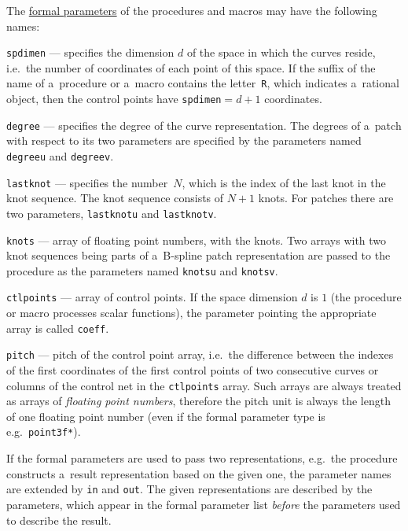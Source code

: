 The \underline{formal parameters} of the procedures and macros may have
the following names:
\begin{mydescription}
  \item\texttt{spdimen} --- specifies the dimension $d$ of the space in which
    the curves reside, i.e.\ the number of coordinates of each point of this
    space.
    If the suffix of the name of a~procedure or a~macro contains the
    letter~\texttt{R}, which indicates a~rational object, then the control points
    have \texttt{spdimen}${}=d+1$ coordinates.
  \item\begin{sloppypar}\texttt{degree} --- specifies the degree of the curve representation.
    The degrees of a~patch with respect to its two parameters are specified by
    the parameters named \texttt{degreeu} and \texttt{degreev}.%
    \end{sloppypar}
  \item\texttt{lastknot} --- specifies the number~$N$, which is the index
    of the last knot in the knot sequence. The knot sequence consists of
    $N+1$ knots. For patches there are two parameters, \texttt{lastknotu} and
    \texttt{lastknotv}.
  \item\texttt{knots} --- array of floating point numbers, with the knots.
    Two arrays with two knot sequences being parts of a~B-spline patch
    representation are passed to the procedure as the parameters named
    \texttt{knotsu} and \texttt{knotsv}.
  \item\texttt{ctlpoints} --- array of control points. If the space
    dimension $d$ is $1$ (the procedure or macro processes scalar functions),
    the parameter pointing the appropriate array is called \texttt{coeff}.
  \item\texttt{pitch} --- pitch of the control point array, i.e.\ the
    difference between the indexes of the first coordinates of the first
    control points of two consecutive curves or columns of the control net
    in the \texttt{ctlpoints} array. Such arrays are always treated as
    arrays of \emph{floating point numbers}, therefore the pitch unit
    is always the length of one floating point number (even if the formal
    parameter type is e.g.\ \texttt{point3f*}).
\end{mydescription}
If the formal parameters are used to pass two representations,
e.g.\ the procedure constructs a~result representation based on the given one,
the parameter names are extended by \texttt{in} and \texttt{out}.
The given representations are described by the parameters, which appear
in the formal parameter list \emph{before} the parameters used to
describe the result.



